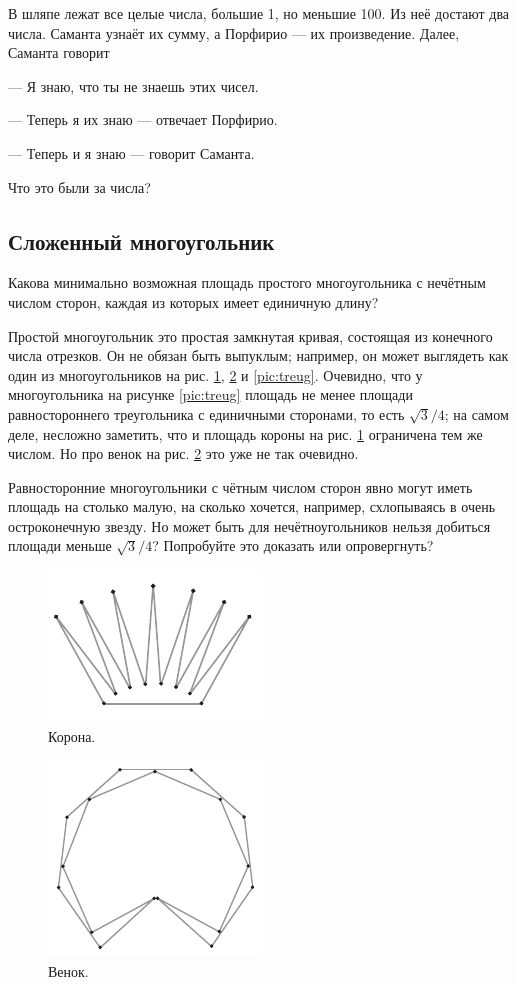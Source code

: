 В шляпе лежат все целые числа, большие 1, но меньшие 100.
Из неё достают два числа.
Саманта узнаёт их сумму, а Порфирио --- их произведение.
Далее, Саманта говорит

--- Я знаю, что ты не знаешь этих чисел.

--- Теперь я их знаю --- отвечает Порфирио.

--- Теперь и я знаю --- говорит Саманта.

Что это были за числа?

\subsection*{Сложенный многоугольник}

Какова минимально возможная площадь простого многоугольника с нечётным числом сторон, каждая из которых имеет единичную длину?

Простой многоугольник это простая замкнутая кривая, состоящая из конечного числа отрезков.
Он не обязан быть выпуклым; например, он может выглядеть как один из многоугольников на рис. \ref{pic:korona},
\ref{pic:wreath} и \ref{pic:treug}.
Очевидно, что у многоугольника на рисунке \ref{pic:treug} площадь не менее площади равностороннего треугольника с единичными сторонами, то есть $\sqrt{3}/4$;
на самом деле, несложно заметить, что и площадь короны на рис. \ref{pic:korona} ограничена тем же числом.
Но про венок на рис. \ref{pic:wreath} это уже не так очевидно.

Равносторонние многоугольники с чётным числом сторон явно могут иметь площадь на столько малую, на сколько хочется, например, схлопываясь в очень остроконечную звезду.
Но может быть для нечётноугольников нельзя добиться площади меньше $\sqrt{3}/4$?
Попробуйте это доказать или опровергнуть?

\begin{figure}[htb!]
\centering
\includegraphics[scale=1]{pics/korona}
\caption{Корона.}
\label{pic:korona}
\end{figure}

\begin{figure}[htb!]
\centering
\includegraphics[scale=1]{pics/wreath}
\caption{Венок.}
\label{pic:wreath}
\end{figure}

